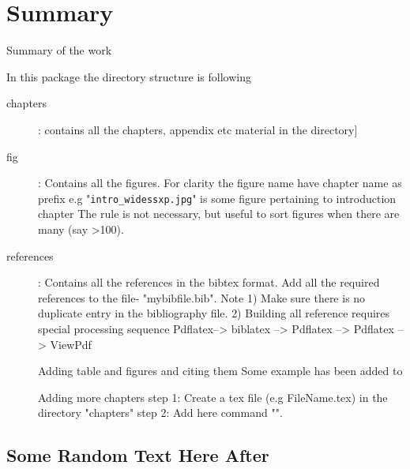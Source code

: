 \chapter*{Summary}
\vspace*{-3em}



Summary of the work 



In this package the directory structure is following 
\begin{description}
\item[chapters]: contains all the chapters, appendix etc material in the directory]
\item[fig]: Contains all the figures. 
           For clarity the figure name have chapter name as prefix e.g 
           "\verb|intro_widessxp.jpg|" is some figure pertaining to introduction chapter
           The rule is not necessary, but useful to sort figures when there are many (say >100).
\item[references]: Contains all the references in the bibtex format. 
             Add all the required references to the file- "mybibfile.bib".
				Note 
      		1) Make sure there is no duplicate entry in the bibliography file.
             2) Building all reference requires special processing sequence 
  			Pdflatex--> biblatex --> Pdflatex --> Pdflatex --> ViewPdf

 Adding table and figures and citing them
  		Some example has been added to 

 Adding more chapters 
 			step 1: Create a tex file (e.g FileName.tex) in the directory "chapters" 
 			step 2: Add here command "". 

\end{description}



\section{Some Random Text Here After}
\lipsum[1-5]
